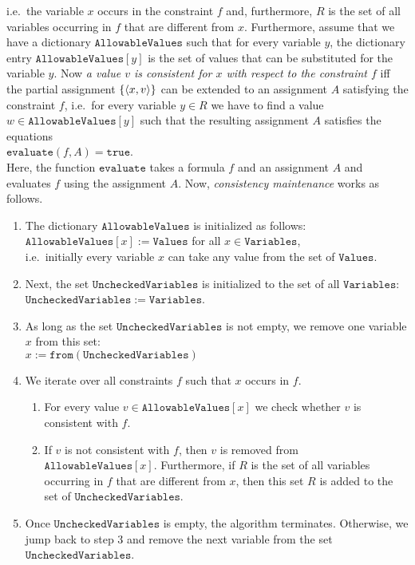 i.e.~the variable $x$ occurs in the constraint $f$ and, furthermore, $R$ is the set of all variables occurring
in $f$ that are different from $x$.  Furthermore, assume that we have a dictionary $\mathtt{AllowableValues}$ such that
for every variable $y$, the dictionary entry $\mathtt{AllowableValues}[y]$ is the set of values that can be substituted
for the variable $y$.  Now  \emph{\color{blue}a value $v$ is consistent for $x$ with respect to the constraint $f$} 
iff the partial assignment $\{ \pair(x, v) \}$ can be extended to an assignment $A$ satisfying the constraint $f$,
i.e.~for every variable $y \in R$ we have to find a value $w \in \mathtt{AllowableValues}[y]$ such that the resulting
assignment $A$ satisfies the equations
\\[0.2cm]
\hspace*{1.3cm}
$\mathtt{evaluate}(f, A) = \mathtt{true}$.
\\[0.2cm]
Here, the function $\mathtt{evaluate}$ takes a formula $f$ and an assignment $A$ and evaluates $f$ using the
assignment $A$.  Now, \emph{\color{blue}consistency maintenance} works as follows.
\begin{enumerate}
\item The dictionary $\mathtt{AllowableValues}$ is initialized as follows:
      \\[0.2cm]
      \hspace*{1.3cm}
      $\mathtt{AllowableValues}[x] := \mathtt{Values}$ \quad for all $x \in \mathtt{Variables}$,
      \\[0.2cm]
      i.e.~initially every variable $x$ can take any value from the set of $\mathtt{Values}$.
\item Next, the set $\mathtt{UncheckedVariables}$ is initialized to the set of all $\mathtt{Variables}$:
      \\[0.2cm]
      \hspace*{1.3cm}
      $\mathtt{UncheckedVariables} := \mathtt{Variables}$.
\item As long as the set $\mathtt{UncheckedVariables}$ is not empty, we remove one variable $x$ from this set:
      \\[0.2cm]
      \hspace*{1.3cm}
      $x := \mathtt{from}(\mathtt{UncheckedVariables})$
\item We iterate over all constraints $f$ such that $x$ occurs in $f$.  
      \begin{enumerate}
      \item For every value $v \in \mathtt{AllowableValues}[x]$ we check whether $v$ is consistent with $f$.
      \item If $v$ is not consistent with $f$, then $v$ is removed from $\mathtt{AllowableValues}[x]$.
            Furthermore, if $R$ is the set of all variables occurring in $f$ that are different from $x$, 
            then this set $R$ is added to the set of $\mathtt{UncheckedVariables}$.
      \end{enumerate}
\item Once $\mathtt{UncheckedVariables}$ is empty, the algorithm terminates.  Otherwise, we jump back to step 3
      and remove the next variable from the set $\mathtt{UncheckedVariables}$.
\end{enumerate}
